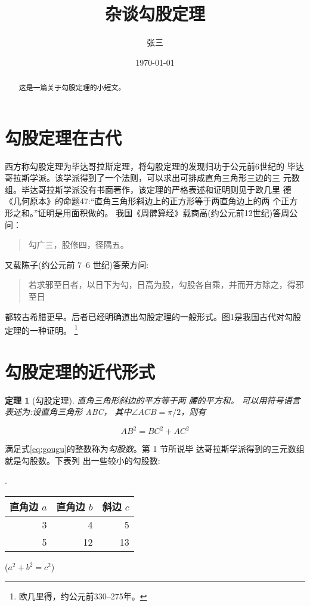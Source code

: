 \documentclass[UTF8]{ctexart}
\title{杂谈勾股定理}
\author{张三}
\date{\today}
\newtheorem{thm}{定理}
\begin{document}
	\maketitle
	\begin{abstract}
		这是一篇关于勾股定理的小短文。
	\end{abstract}
	\tableofcontents
	\section{勾股定理在古代}
	西方称勾股定理为毕达哥拉斯定理，将勾股定理的发现归功于公元前6世纪的
毕达哥拉斯学派\cite{Kline}。该学派得到了一个法则，可以求出可排成直角三角形三边的三 元数组。毕达哥拉斯学派没有书面著作，该定理的严格表述和证明则见于欧几里 德《几何原本》的命题47:“直角三角形斜边上的正方形等于两直角边上的两
个正方形之和。”证明是用面积做的。 我国《周髀算经》载商高(约公元前12世纪)答周公问：
	\begin{quote}
	\kaishu
		勾广三，股修四，径隅五。
	\end{quote}
	又载陈子(约公元前 7--6 世纪)答荣方问:
	\begin{quote}
	\kaishu
		若求邪至日者，以日下为勾，日高为股，勾股各自乘，并而开方除之，得邪至日
	\end{quote}
	都较古希腊更早。后者已经明确道出勾股定理的一般形式。图1是我国古代对勾股定理的一种证明\cite{quanjing}。
	\footnote{欧几里得，约公元前330--275年。}


	

	\section{勾股定理的近代形式}
	
	
	\begin{thm}[勾股定理]
	直角三角形斜边的平方等于两 腰的平方和。
可以用符号语言表述为:设直角三角形 ABC， 其中$\angle ACB = \pi / 2$，则有	
	\end{thm}

	
	\begin{equation}\label{eq:gougu}
		AB^2 = BC^2 + AC^2
	\end{equation}
	
	满足式\eqref{eq:gougu}的整数称为\emph{勾股数}。第 1 节所说毕 达哥拉斯学派得到的三元数组就是勾股数。下表列 出一些较小的勾股数:
		
	\begin{table}[h].            %
		\begin{tabular}{|rrr|}
		\hline
		直角边 $a$ & 直角边 $b$ & 斜边 $c$\\
		\hline 
		3 & 4 & 5 \\
		5 & 12 & 13 \\
		\hline	
		\end{tabular}%
		\qquad
		($a^2 + b^2 = c^2$)
	\end{table}
	
	
	
	\nocite{Shiya}
	
	
\end{document}
